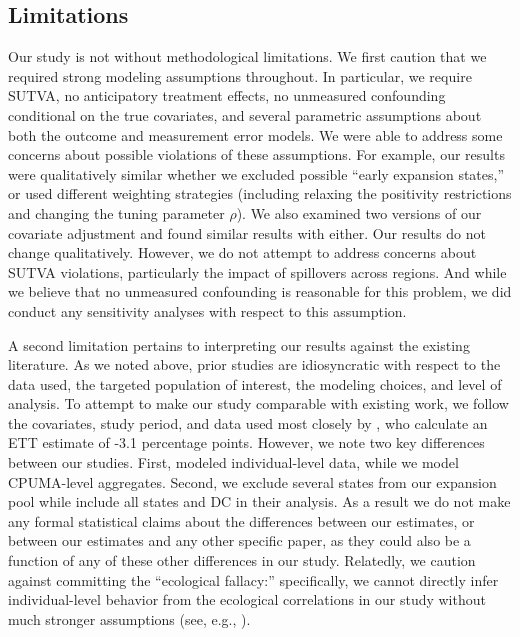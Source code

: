 \subsection{Limitations}

Our study is not without methodological limitations. We first caution that we required strong modeling assumptions throughout. In particular, we require SUTVA, no anticipatory treatment effects, no unmeasured confounding conditional on the true covariates, and several parametric assumptions about both the outcome and measurement error models. We were able to address some concerns about possible violations of these assumptions. For example, our results were qualitatively similar whether we excluded possible ``early expansion states,'' or used different weighting strategies (including relaxing the positivity restrictions and changing the tuning parameter $\rho$). We also examined two versions of our covariate adjustment and found similar results with either. Our results do not change qualitatively. However, we do not attempt to address concerns about SUTVA violations, particularly the impact of spillovers across regions. And while we believe that no unmeasured confounding is reasonable for this problem, we did conduct any sensitivity analyses with respect to this assumption.

A second limitation pertains to interpreting our results against the existing literature. As we noted above, prior studies are idiosyncratic with respect to the data used, the targeted population of interest, the modeling choices, and level of analysis. To attempt to make our study comparable with existing work, we follow the covariates, study period, and data used most closely by \cite{courtemanche2017early}, who calculate an ETT estimate of -3.1 percentage points. However, we note two key differences between our studies. First, \cite{courtemanche2017early} modeled individual-level data, while we model CPUMA-level aggregates. Second, we exclude several states from our expansion pool while \cite{courtemanche2017early} include all states and DC in their analysis. As a result we do not make any formal statistical claims about the differences between our estimates, or between our estimates and any other specific paper, as they could also be a function of any of these other differences in our study. Relatedly, we caution against committing the ``ecological fallacy:'' specifically, we cannot directly infer individual-level behavior from the ecological correlations in our study without much stronger assumptions (see, e.g., \cite{subramanian2009revisiting}).

